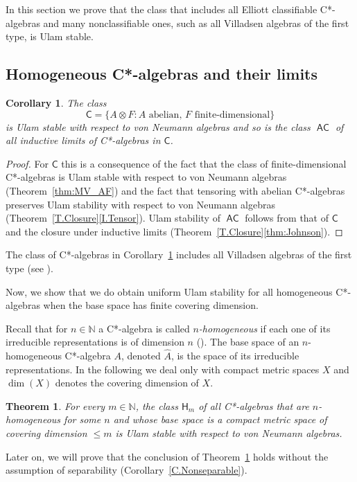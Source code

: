 \documentclass[11pt]{amsproc}
\newcommand{\bbN}{\mathbb N}
\newcommand{\cstar}{C*}
\newcommand{\sfC}{\mathsf C}
\newcommand{\sfH}{\mathsf {H}}
\DeclareMathOperator{\sfAC}{\mathsf {AC}}
\theoremstyle{definition}
\theoremstyle{plain}
\newtheorem{theorem}[definition]{Theorem}
\newtheorem{corollary}[definition]{Corollary}
\theoremstyle{remark}
\begin{document}
In this section we prove that the class that includes all Elliott classifiable \cstar-algebras and many nonclassifiable ones, such as all Villadsen algebras of the first type,   is Ulam stable. 


\subsection{Homogeneous \cstar-algebras and their limits}

\begin{corollary}
	\label{T.AH}  The class 
	\[
	\sfC=\{A\otimes F: A\text{ abelian, $F$ finite-dimensional}\}
	\]
	is Ulam stable with respect to von Neumann algebras and so is 
	the class $\sfAC$ of all inductive limits of \cstar-algebras in $\sfC$.  
\end{corollary}
\begin{proof}
	For $\sfC$ this is a consequence of  the fact that the class of finite-dimensional \cstar-algebras is Ulam stable with respect to von Neumann algebras (Theorem~\ref{thm:MV_AF})  and the fact that tensoring with abelian \cstar-algebras preserves Ulam stability with respect to von Neumann algebras (Theorem~\ref{T.Closure}\eqref{I.Tensor}). 
	Ulam stability of $\sfAC$ follows from that of $\sfC$ and  the closure under inductive limits (Theorem~\ref{T.Closure}\eqref{thm:Johnson}). 
\end{proof}

The class of \cstar-algebras in Corollary~\ref{T.AH} includes all Villadsen algebras of the first type (see \cite[\S 3.1]{toms2009Elliott}). 

Now, we show that we do obtain uniform Ulam stability for all homogeneous \cstar-algebras when the base space has finite covering dimension.


Recall that for $n\in \bbN$ a \cstar-algebra is called \emph{$n$-homogeneous} if each one of its irreducible representations is of dimension $n$ (\cite[IV.1.4.1]{Black:Operator}). The base space of an $n$-homogeneous \cstar-algebra $A$, denoted $\hat A$,  is the space of its irreducible representations. In the following we deal only with compact metric spaces $X$ and $\dim(X)$ denotes the covering dimension of $X$. 

\begin{theorem}\label{T.Homogeneous}
	For every $m\in \bbN$, the class $\sfH_m$ of all \cstar-algebras that are $n$-homogeneous for some $n$ and whose base space is a compact metric space of covering dimension $\leq m$ is Ulam stable with respect to von Neumann algebras.
\end{theorem}
Later on, we will prove that the conclusion of Theorem~\ref{T.Homogeneous} holds without the assumption of separability (Corollary~\ref{C.Nonseparable}). 
\end{document}
